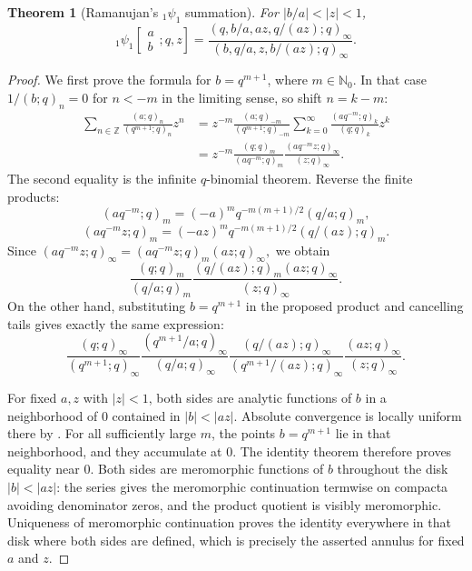 \documentclass[11pt,oneside,openany]{book}
\newtheorem{theorem}{Theorem}[chapter]
\theoremstyle{definition}
\theoremstyle{remark}
\newcommand{\Z}{\mathbb Z}
\newcommand{\N}{\mathbb N}
\newcommand{\abs}[1]{\lvert #1\rvert}
\begin{document}
\begin{theorem}[Ramanujan's ${}_1\psi_1$ summation]\label{thm:1psi1}
For $\abs{b/a}<\abs z<1$,
\[
 {}_1\psi_1\!\left[\begin{matrix}a\\b\end{matrix};q,z\right]
 =\frac{(q,b/a,az,q/(az);q)_\infty}
 {(b,q/a,z,b/(az);q)_\infty}.
\]
\end{theorem}

\begin{proof}
We first prove the formula for $b=q^{m+1}$, where $m\in\N_0$.  In that case $1/(b;q)_n=0$ for $n<-m$ in the limiting sense, so shift $n=k-m$:
\begin{align*}
 \sum_{n\in\Z}\frac{(a;q)_n}{(q^{m+1};q)_n}z^n
 &=z^{-m}\frac{(a;q)_{-m}}{(q^{m+1};q)_{-m}}
 \sum_{k=0}^{\infty}\frac{(aq^{-m};q)_k}{(q;q)_k}z^k\\
 &=z^{-m}\frac{(q;q)_m}{(aq^{-m};q)_m}
 \frac{(aq^{-m}z;q)_\infty}{(z;q)_\infty}.
\end{align*}
The second equality is the infinite $q$-binomial theorem.  Reverse the finite products:
\[
 (aq^{-m};q)_m=(-a)^mq^{-m(m+1)/2}(q/a;q)_m,
\]
\[
 (aq^{-m}z;q)_m=(-az)^mq^{-m(m+1)/2}(q/(az);q)_m.
\]
Since
\(
 (aq^{-m}z;q)_\infty=(aq^{-m}z;q)_m(az;q)_\infty,
\)
we obtain
\[
 \frac{(q;q)_m}{(q/a;q)_m}
 \frac{(q/(az);q)_m(az;q)_\infty}{(z;q)_\infty}.
\]
On the other hand, substituting $b=q^{m+1}$ in the proposed product and cancelling tails gives exactly the same expression:
\[
 \frac{(q;q)_\infty}{(q^{m+1};q)_\infty}
 \frac{(q^{m+1}/a;q)_\infty}{(q/a;q)_\infty}
 \frac{(q/(az);q)_\infty}{(q^{m+1}/(az);q)_\infty}
 \frac{(az;q)_\infty}{(z;q)_\infty}.
\]

For fixed $a,z$ with $\abs z<1$, both sides are analytic functions of $b$ in a neighborhood of $0$ contained in $\abs b<\abs{az}$.  Absolute convergence is locally uniform there by .  For all sufficiently large $m$, the points $b=q^{m+1}$ lie in that neighborhood, and they accumulate at $0$.  The identity theorem therefore proves equality near $0$.  Both sides are meromorphic functions of $b$ throughout the disk $\abs b<\abs{az}$: the series gives the meromorphic continuation termwise on compacta avoiding denominator zeros, and the product quotient is visibly meromorphic.  Uniqueness of meromorphic continuation proves the identity everywhere in that disk where both sides are defined, which is precisely the asserted annulus for fixed $a$ and $z$.
\end{proof}
\end{document}
